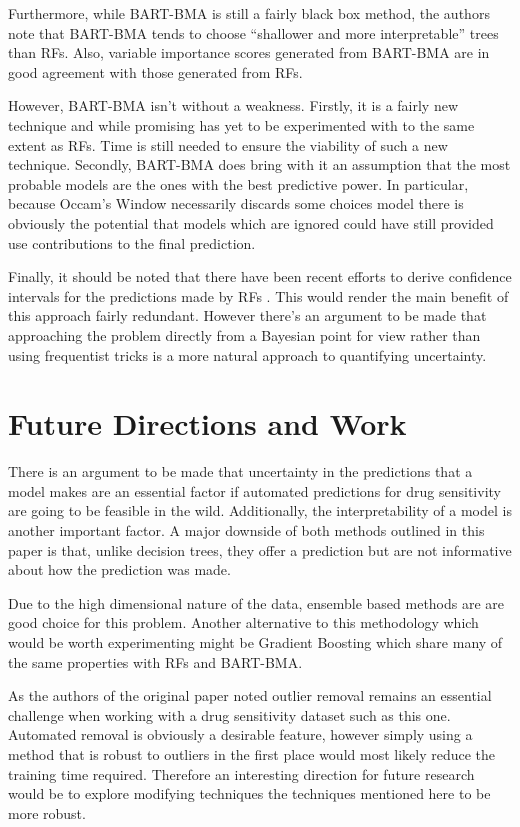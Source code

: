 \documentclass[journal]{IEEEtran}
\begin{document}
Furthermore, while BART-BMA is still a fairly black box method, the authors note that BART-BMA tends to choose ``shallower and more interpretable'' \cite{hernandez2015bayesian} trees than RFs. Also, variable importance scores generated from BART-BMA are in good agreement with those generated from RFs.

However, BART-BMA isn't without a weakness. Firstly, it is a fairly new technique and while promising has yet to be experimented with to the same extent as RFs. Time is still needed to ensure the viability of such a new technique. Secondly, BART-BMA does bring with it an assumption that the most probable models are the ones with the best predictive power. In particular, because Occam's Window necessarily discards some choices model there is obviously the potential that models which are ignored could have still provided use contributions to the final prediction.

Finally, it should be noted that there have been recent efforts to derive confidence intervals for the predictions made by RFs \cite{wager2014confidence}. This would render the main benefit of this approach fairly redundant. However there's an argument to be made that approaching the problem directly from a Bayesian point for view rather than using frequentist tricks is a more natural approach to quantifying uncertainty.

\section{Future Directions and Work}
There is an argument to be made that uncertainty in the predictions that a model makes are an essential factor if automated predictions for drug sensitivity are going to be feasible in the wild. Additionally, the interpretability of a model is another important factor. A major downside of both methods outlined in this paper is that, unlike decision trees, they offer a prediction but are not informative about how the prediction was made.

Due to the high dimensional nature of the data, ensemble based methods are are good choice for this problem. Another alternative to this methodology which would be worth experimenting might be Gradient Boosting \cite{friedman2001greedy} which share many of the same properties with RFs and BART-BMA.

As the authors of the original paper noted outlier removal remains an essential challenge when working with a drug sensitivity dataset such as this one. Automated removal is obviously a  desirable feature, however simply using a method that is robust to outliers in the first place would most likely reduce the training time required. Therefore an interesting direction for future research would be to explore modifying techniques the techniques mentioned here to be more robust.
\end{document}
